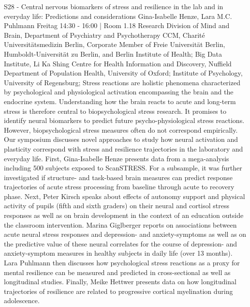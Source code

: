 
            \begin{symposium}
            {S28 - Central nervous biomarkers of stress and resilience in the lab and in everyday life: Predictions and considerations }
            {Gina-Isabelle Henze, Lara M.C. Puhlmann}
            {Freitag 14:30 - 16:00 | Room 1.18}
            {Research Division of Mind and Brain, Department of Psychiatry and Psychotherapy CCM, Charité Universitätsmedizin Berlin, Corporate Member of Freie Universität Berlin, Humboldt-Universität zu Berlin, and Berlin Institute of Health; Big Data Institute, Li Ka Shing Centre for Health Information and Discovery, Nuffield Department of Population Health, University of Oxford; Institute of Psychology, University of Regensburg;}
            Stress reactions are holistic phenomena characterized by psychological and physiological activation encompassing the brain and the endocrine system. Understanding how the brain reacts to acute and long-term stress is therefore central to biopsychological stress research. It promises to identify neural biomarkers to predict future psycho-physiological stress reactions. However, biopsychological stress measures often do not correspond empirically. Our symposium discusses novel approaches to study how neural activation and plasticity correspond with stress and resilience trajectories in the laboratory and everyday life.
First, Gina-Isabelle Henze presents data from a mega-analysis including 500 subjects exposed to ScanSTRESS. For a subsample, it was further investigated if structure- and task-based brain measures can predict response trajectories of acute stress processing from baseline through acute to recovery phase.
Next, Peter Kirsch speaks about effects of autonomy support and physical activity of pupils (fifth and sixth graders) on their neural and cortisol stress responses as well as on brain development in the context of an education outside the classroom intervention.
Marina Giglberger reports on associations between acute neural stress responses and depression- and anxiety-symptoms as well as on the predictive value of these neural correlates for the course of depression- and anxiety-symptom measures in healthy subjects in daily life (over 13 months).
Lara Puhlmann then discusses how psychological stress reactions as a proxy for mental resilience can be measured and predicted in cross-sectional as well as longitudinal studies.
Finally, Meike Hettwer presents data on how longitudinal trajectories of resilience are related to progressive cortical myelination during adolescence.
            \begin{description}    
            

\end{description}
\end{symposium}
